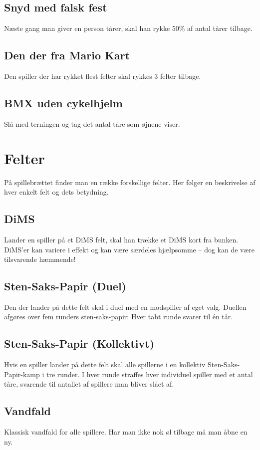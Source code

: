 \documentclass{article}
\begin{document}
\subsection{Snyd med falsk fest} 
Næste gang man giver en person tårer, skal han rykke 50\% af antal tårer tilbage.
 
\subsection{Den der fra Mario Kart} 
Den spiller der har rykket flest felter skal rykkes 3 felter tilbage.
 
\subsection{BMX uden cykelhjelm} 
Slå med terningen og tag det antal tåre som øjnene viser.
 

\section{Felter}
På spillebrættet finder man en række forskellige felter. Her følger en beskrivelse af hver enkelt felt og dets betydning.
 
\subsection{DiMS}
Lander en spiller på et DiMS felt, skal han trække et DiMS kort fra bunken. DiMS'er kan variere i effekt og kan være særdeles hjælpsomme – dog kan de være tilsvarende hæmmende!
 
\subsection{Sten-Saks-Papir (Duel)}
Den der lander på dette felt skal i duel med en modspiller af eget valg. Duellen afgøres over fem runders sten-saks-papir: Hver tabt runde svarer til én tår.
 
\subsection{Sten-Saks-Papir (Kollektivt)}
Hvis en spiller lander på dette felt skal alle spillerne i en kollektiv Sten-Saks-Papir-kamp i tre runder. I hver runde straffes hver individuel spiller med et antal tåre, svarende til antallet af spillere man bliver slået af.
 
\subsection{Vandfald}
Klassisk vandfald for alle spillere. Har man ikke nok øl tilbage må man åbne en ny.
 
\end{document}
